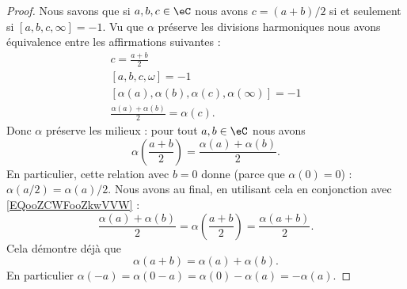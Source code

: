 \begin{proof}
    Nous savons que si \( a,b,c\in \eC\) nous avons \( c=(a+b)/2\) si et seulement si \( [a,b,c,\infty]=-1\). Vu que \( \alpha\) préserve les divisions harmoniques nous avons équivalence entre les affirmations suivantes :
    \begin{subequations}
        \begin{align}
            c=\frac{ a+b }{ 2 }\\
            [a,b,c,\omega]=-1\\
            [\alpha(a),\alpha(b),\alpha(c),\alpha(\infty)]=-1\\
            \frac{ \alpha(a)+\alpha(b) }{2}=\alpha(c).
        \end{align}
    \end{subequations}
    Donc \( \alpha\) préserve les milieux : pour tout \( a,b\in \eC\) nous avons
    \begin{equation}        \label{EQooZCWFooZkwVVW}
        \alpha\left( \frac{ a+b }{2} \right)=\frac{ \alpha(a)+\alpha(b) }{2}.
    \end{equation}
    En particulier, cette relation avec \( b=0\) donne (parce que \( \alpha(0)=0\)) : \( \alpha(a/2)=\alpha(a)/2\). Nous avons au final, en utilisant cela en conjonction avec \eqref{EQooZCWFooZkwVVW} :
    \begin{equation}
        \frac{ \alpha(a)+\alpha(b) }{2}=\alpha\left( \frac{ a+b }{2} \right)=\frac{ \alpha(a+b) }{ 2 }.
    \end{equation}
    Cela démontre déjà que
    \begin{equation}
        \alpha(a+b)=\alpha(a)+\alpha(b).
    \end{equation}
    En particulier \( \alpha(-a)=\alpha(0-a)=\alpha(0)-\alpha(a)=-\alpha(a)\).


\end{proof}
